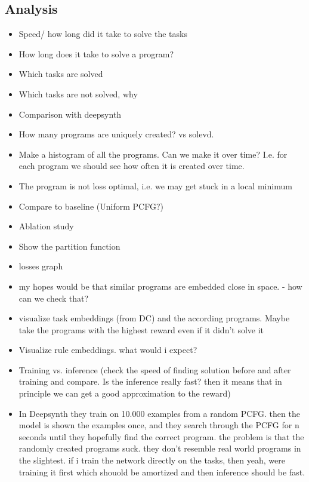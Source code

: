 \subsection{Analysis}
\begin{itemize}
    \item Speed/ how long did it take to solve the tasks
    \item How long does it take to solve a program?
    \item Which tasks are solved
    \item Which tasks are not solved, why
    \item Comparison with deepsynth
    \item How many programs are uniquely created? vs solevd.
	\item Make a histogram of all the programs. Can we make it over time? I.e. for each program we should see how often it is created over time. 
    \item The program is not loss optimal, i.e. we may get stuck in a local minimum
    \item Compare to baseline (Uniform PCFG?)
    \item Ablation study
    \item Show the partition function 
    \item losses graph
    \item my hopes would be that similar programs are embedded close in space. - how can we check that?
    \item visualize task embeddings (from DC) and the according programs. Maybe take the programs with the highest reward even if it didn't solve it
    \item Visualize rule embeddings. what would i expect? 
    \item Training vs. inference (check the speed of finding solution before and after training and compare. Is the inference really fast? then it means that in principle we can get a good approximation to the reward)
    \item In Deepsynth they train on 10.000 examples from a random PCFG. then the model is shown the examples once, and they search through the PCFG for n seconds until they hopefully find the correct program. the problem is that the randomly created programs suck. they don't resemble real world programs in the slightest. if i train the network directly on the tasks, then yeah, were training it first which shouold be amortized and then inference should be fast.
\end{itemize}

